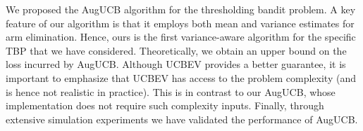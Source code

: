 We proposed the AugUCB algorithm for the thresholding bandit problem. A key feature of our algorithm is that it employs both mean and variance estimates for arm elimination. Hence, ours is the first variance-aware algorithm for the specific TBP that we have considered. Theoretically, we obtain an upper bound on the loss incurred by AugUCB. Although UCBEV provides a better guarantee, it is important to emphasize that UCBEV has access to the problem complexity (and is hence not realistic in practice). This is in contrast to our AugUCB, whose implementation does not require such complexity inputs. 
Finally, through extensive simulation experiments we have validated the performance of AugUCB.



